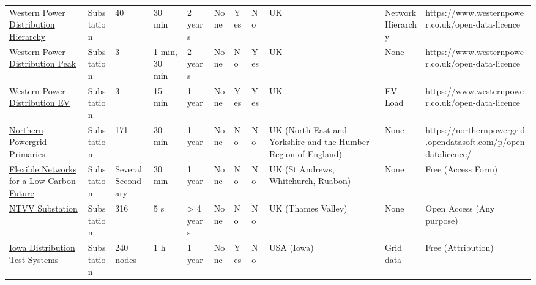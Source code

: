 \begin{tabular}{lllllllllll}
\href{\url{https://codalab.lisn.upsaclay.fr/competitions/2625}}{Western Power Distribution Hierarchy} &  Substation &40 &   30 min &  2 years &  None & Yes &  No & UK &  Network Hierarchy &https://www.westernpower.co.uk/open-data-licence \\
\href{\url{https://connecteddata.westernpower.co.uk/dataset/western-power-distribution-data-challenge-1-high-resolution-peak-estimation}}{Western Power Distribution Peak} &  Substation & 3 &1 min, 30 min &  2 years &  None &  No & Yes & UK &   None &https://www.westernpower.co.uk/open-data-licence \\
\href{\url{https://connecteddata.westernpower.co.uk/dataset/western-power-distribution-data-challenge-2-estimating-ev-charger-demand}}{Western Power Distribution EV} &  Substation & 3 &   15 min &   1 year &  None & Yes & Yes & UK &EV Load &https://www.westernpower.co.uk/open-data-licence \\
\href{\url{https://doi.org/10.25405/data.ncl.22047758}}{Northern Powergrid Primaries} &  Substation &   171 &   30 min &   1 year &  None &  No &  No & UK (North East and Yorkshire and the Humber Region of England) &   None &   https://northernpowergrid.opendatasoft.com/p/opendatalicence/ \\
\href{\url{https://www.spenergynetworks.co.uk/pages/flexible_network_data_share.aspx}}{Flexible Networks for a Low Carbon Future} &  Substation & Several Secondary &   30 min &   1 year &  None &  No &  No &UK (St Andrews, Whitchurch, Ruabon) &   None &  Free (Access Form) \\
\href{\url{https://ukerc.rl.ac.uk/DC/cgi-bin/edc_search.pl?WantComp=146}}{NTVV Substation} &  Substation &   316 &  5 s &> 4 years &  None &  No &  No & UK (Thames Valley) &   None &   Open Access (Any purpose) \\
\href{\url{http://wzy.ece.iastate.edu/Testsystem.html}}{Iowa Distribution Test Systems} &  Substation & 240 nodes &  1 h &   1 year &  None & Yes &  No & USA (Iowa) &  Grid data &  Free (Attribution) \\
\bottomrule
\end{tabular}
